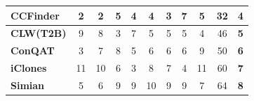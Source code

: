 \documentclass[review]{elsarticle}
\begin{document}
\begin{table}[htbp]
\begin{tabular}{lcccccccccc}
\multicolumn{1}{|l|}{\textbf{CCFinder}}                                                         & \multicolumn{1}{c|}{2}           & \multicolumn{1}{c|}{2}           & \multicolumn{1}{c|}{5}           & \multicolumn{1}{c|}{4}           & \multicolumn{1}{c|}{4}           & \multicolumn{1}{c|}{3}           & \multicolumn{1}{c|}{7}           & \multicolumn{1}{c|}{5}           & \multicolumn{1}{c|}{32}                                                               & \multicolumn{1}{c|}{\textbf{4}}                                                    \\ \hline
\multicolumn{1}{|l|}{\textbf{CLW(T2B)}}                                                     & \multicolumn{1}{c|}{9}           & \multicolumn{1}{c|}{8}           & \multicolumn{1}{c|}{3}           & \multicolumn{1}{c|}{7}           & \multicolumn{1}{c|}{5}           & \multicolumn{1}{c|}{5}           & \multicolumn{1}{c|}{5}           & \multicolumn{1}{c|}{4}           & \multicolumn{1}{c|}{46}                                                               & \multicolumn{1}{c|}{\textbf{5}}                                                    \\ \hline
\multicolumn{1}{|l|}{\textbf{ConQAT}}                                                           & \multicolumn{1}{c|}{3}           & \multicolumn{1}{c|}{7}           & \multicolumn{1}{c|}{8}           & \multicolumn{1}{c|}{5}           & \multicolumn{1}{c|}{6}           & \multicolumn{1}{c|}{6}           & \multicolumn{1}{c|}{6}           & \multicolumn{1}{c|}{9}           & \multicolumn{1}{c|}{50}                                                               & \multicolumn{1}{c|}{\textbf{6}}                                                    \\ \hline
\multicolumn{1}{|l|}{\textbf{iClones}}                                                          & \multicolumn{1}{c|}{11}          & \multicolumn{1}{c|}{10}          & \multicolumn{1}{c|}{6}           & \multicolumn{1}{c|}{3}           & \multicolumn{1}{c|}{8}           & \multicolumn{1}{c|}{7}           & \multicolumn{1}{c|}{4}           & \multicolumn{1}{c|}{11}          & \multicolumn{1}{c|}{60}                                                               & \multicolumn{1}{c|}{\textbf{7}}                                                    \\ \hline
\multicolumn{1}{|l|}{\textbf{Simian}}                                                           & \multicolumn{1}{c|}{5}           & \multicolumn{1}{c|}{6}           & \multicolumn{1}{c|}{9}           & \multicolumn{1}{c|}{9}           & \multicolumn{1}{c|}{10}          & \multicolumn{1}{c|}{9}           & \multicolumn{1}{c|}{9}           & \multicolumn{1}{c|}{7}           & \multicolumn{1}{c|}{64}                                                               & \multicolumn{1}{c|}{\textbf{8}}                                                    \\ \hline

\end{tabular}
\end{table}
\end{document}
